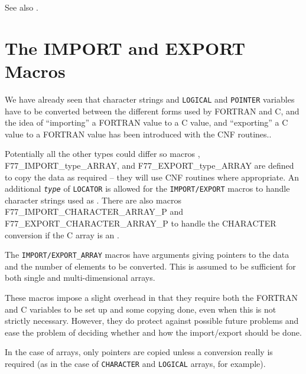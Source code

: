 \documentclass[twoside,11pt,nolof]{starlink}
\begin{document}
See also
.

\section{\label{import_export}The IMPORT and EXPORT Macros}
We have already seen that character strings and \texttt{LOGICAL} and
\texttt{POINTER} variables
have to be converted between the different forms used by FORTRAN and C, and
the idea of ``importing'' a FORTRAN value to a C value, and ``exporting'' a C
value to a FORTRAN value has been introduced with the CNF routines..

Potentially all the other types could differ so macros
,
{F77_IMPORT_type_ARRAY},
and
{F77_EXPORT_type_ARRAY}
are defined to copy the data as required -- they will use CNF routines
where appropriate. An additional \texttt{\textit{type}} of \texttt{LOCATOR}
is allowed for the \texttt{IMPORT/EXPORT} macros to handle character strings
used as
.
There are also macros
        {F77_IMPORT_CHARACTER_ARRAY_P}
and
        {F77_EXPORT_CHARACTER_ARRAY_P}
to handle the CHARACTER conversion if the C array is an
.

The \texttt{IMPORT/EXPORT\_ARRAY} macros have arguments giving pointers to
the data and the number of elements to be converted. This is assumed to be
sufficient for both single and multi-dimensional arrays.

These macros impose a slight overhead in that they require both the FORTRAN and
C variables to be set up and some copying done, even when this is not strictly
necessary.
However, they do protect against possible future problems and ease the
problem of deciding whether and how the import/export should be done.

In the case of arrays, only pointers are copied unless a conversion really is
required (as in the case of \texttt{CHARACTER} and \texttt{LOGICAL} arrays, for
example).
\end{document}
